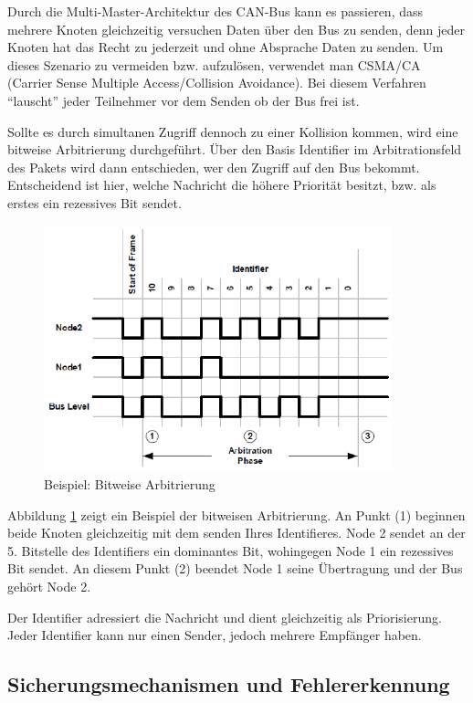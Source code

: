 Durch die Multi-Master-Architektur des CAN-Bus kann es passieren, dass mehrere Knoten gleichzeitig versuchen
Daten über den Bus zu senden, denn jeder Knoten hat das Recht zu jederzeit und ohne Absprache Daten zu senden.
Um dieses Szenario zu vermeiden bzw. aufzulösen, verwendet man CSMA/CA (Carrier Sense Multiple 
Access/Collision Avoidance). Bei diesem Verfahren ``lauscht'' jeder Teilnehmer vor dem Senden ob der Bus frei ist.

Sollte es durch simultanen Zugriff dennoch zu einer Kollision kommen, wird eine bitweise Arbitrierung durchgeführt.
Über den Basis Identifier im Arbitrationsfeld des Pakets wird dann entschieden, wer den Zugriff auf den Bus bekommt.
Entscheidend ist hier, welche Nachricht die höhere Priorität besitzt, bzw. als erstes ein rezessives Bit sendet.

\begin{figure}[h] 
\centering
\includegraphics[width=0.9\textwidth]{figures/bitwisearb}
\caption{Beispiel: Bitweise Arbitrierung \citep{BWA}} 
\label{pic:bitwise}
\end{figure} 

Abbildung \ref{pic:bitwise} zeigt ein Beispiel der bitweisen Arbitrierung. An Punkt (1) beginnen beide 
Knoten gleichzeitig mit dem senden Ihres Identifieres. Node 2 sendet an der 5. Bitstelle des Identifiers 
ein dominantes Bit, wohingegen Node 1 ein rezessives Bit sendet. An diesem Punkt (2) beendet 
Node 1 seine Übertragung und der Bus gehört Node 2.

Der Identifier adressiert die Nachricht und dient gleichzeitig als Priorisierung. Jeder Identifier kann 
nur einen Sender, jedoch mehrere Empfänger haben.

\subsection{Sicherungsmechanismen und Fehlererkennung}
\label{sec:security}

